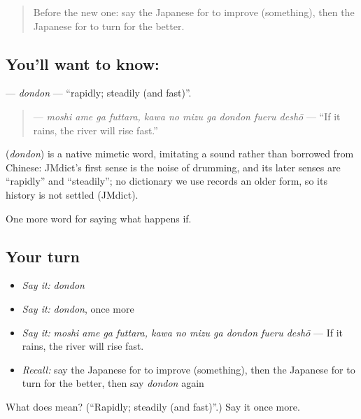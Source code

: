 \begin{quote}
Before the new one: say the Japanese for to improve (something), then the Japanese for to turn for the better.
\end{quote}

\subsection*{You'll want to know: }
\textbf{} — \emph{dondon} — \textquotedblleft{}rapidly; steadily (and fast)\textquotedblright{}.

\begin{quote}
\textbf{     } — \emph{moshi ame ga futtara, kawa no mizu ga dondon fueru deshō} — \textquotedblleft{}If it rains, the river will rise fast.\textquotedblright{}
\end{quote}

\begin{cousinweb}
\textbf{} (\emph{dondon}) is a native mimetic word, imitating a sound rather than borrowed from Chinese: JMdict's first sense is the noise of drumming, and its later senses are \textquotedblleft{}rapidly\textquotedblright{} and \textquotedblleft{}steadily\textquotedblright{}; no dictionary we use records an older form, so its history is not settled (JMdict).
\end{cousinweb}

\begin{grammarlens}[title={What you've built}]
One more word for saying what happens if.
\end{grammarlens}

\subsection*{Your turn}
\begin{itemize}
\raggedright
  \item \emph{Say it:} \emph{dondon}
  \item \emph{Say it:} \emph{dondon}, once more
  \item \emph{Say it:} \emph{moshi ame ga futtara, kawa no mizu ga dondon fueru deshō} — If it rains, the river will rise fast.
  \item \emph{Recall:} say the Japanese for to improve (something), then the Japanese for to turn for the better, then say \emph{dondon} again
\end{itemize}

\begin{tcolorbox}[breakable,colback=teal!4,colframe=teal!35!black,title={Before you move on}]
What does  mean? (\textquotedblleft{}Rapidly; steadily (and fast)\textquotedblright{}.) Say it once more.
\end{tcolorbox}
